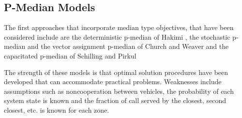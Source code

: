 \subsection{P-Median Models}
The first approaches
that incorporate median type objectives,
that have been considered include are
the deterministic p-median of Hakimi \cite{hakimi1964optimum},
the stochastic p-median and the vector assignment p-median of Church and Weaver
\cite{weaver1983computational,weaver1985median}
and the capacitated p-median of Schilling and Pirkul \cite{pirkul1988siting}

The strength of these models
is that optimal solution procedures
have been developed
that can accommodate practical problems.
Weaknesses include assumptions
such as noncooperation between vehicles,
the probability of each system state is known
and the fraction of call
served by the closest, second closest, etc.
is known for each zone.

